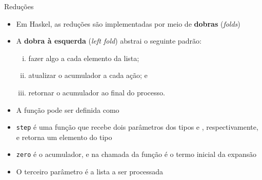 \begin{frame}[fragile]{Reduções}

    \begin{itemize}
        \item Em Haskel, as reduções são implementadas por meio de \textbf{dobras} (\textit{folds})

        \item A \textbf{dobra à esquerda} (\textit{left fold}) abstrai o seguinte padrão:
        \begin{enumerate}[i.]
            \item fazer algo a cada elemento da lista;
            \item atualizar o acumulador a cada ação; e
            \item retornar o acumulador ao final do processo.
        \end{enumerate}

        \item A função  pode ser definida como


        \item \texttt{step} é uma função que recebe dois parâmetros dos tipos 
             e , respectivamente, e retorna um elemento do
            tipo 

        \item \texttt{zero} é o acumulador, e na chamada da função 
            é o termo inicial da expansão

        \item O terceiro parâmetro é a lista a ser processada
    \end{itemize}

\end{frame}

